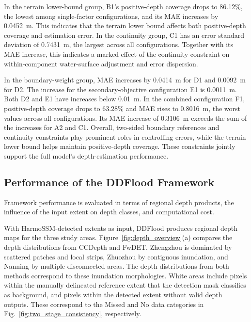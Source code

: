\documentclass[authoryear,preprint,12pt]{elsarticle}
\begin{document}
In the terrain lower-bound group, B1's positive-depth coverage drops to 86.12\%, the lowest among single-factor configurations, and its MAE increases by 0.0452~m. This indicates that the terrain lower bound affects both positive-depth coverage and estimation error. In the continuity group, C1 has an error standard deviation of 0.7431~m, the largest across all configurations. Together with its MAE increase, this indicates a marked effect of the continuity constraint on within-component water-surface adjustment and error dispersion.

In the boundary-weight group, MAE increases by 0.0414~m for D1 and 0.0092~m for D2. The increase for the secondary-objective configuration E1 is 0.0011~m. Both D2 and E1 have increases below 0.01~m. In the combined configuration F1, positive-depth coverage drops to 63.28\% and MAE rises to 0.8016~m, the worst values across all configurations. Its MAE increase of 0.3106~m exceeds the sum of the increases for A2 and C1. Overall, two-sided boundary references and continuity constraints play prominent roles in controlling errors, while the terrain lower bound helps maintain positive-depth coverage. These constraints jointly support the full model's depth-estimation performance.

\FloatBarrier

\subsection{Performance of the DDFlood Framework}\label{sec:ddflood_framework_evaluation}

Framework performance is evaluated in terms of regional depth products, the influence of the input extent on depth classes, and computational cost.

With HarmoSSM-detected extents as input, DDFlood produces regional depth maps for the three study areas. Figure~\ref{fig:depth_overview}(a) compares the depth distributions from CCDepth and FwDET. Zhengzhou is dominated by scattered patches and local strips, Zhuozhou by contiguous inundation, and Nanning by multiple disconnected areas. The depth distributions from both methods correspond to these inundation morphologies. White areas include pixels within the manually delineated reference extent that the detection mask classifies as background, and pixels within the detected extent without valid depth outputs. These correspond to the Missed and No data categories in Fig.~\ref{fig:two_stage_consistency}, respectively.
\end{document}
